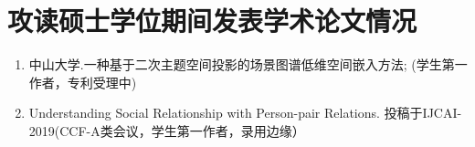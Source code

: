 
\chapter*{攻读硕士学位期间发表学术论文情况}

\begin{enumerate}
    \item 中山大学.一种基于二次主题空间投影的场景图谱低维空间嵌入方法; (学生第一作者，专利受理中)
	\item Understanding Social Relationship with Person-pair Relations. 投稿于IJCAI-2019(CCF-A类会议，学生第一作者，录用边缘）
   
\end{enumerate}

